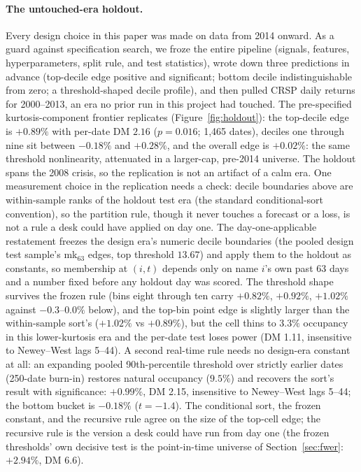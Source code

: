 \documentclass[11pt]{article}
\theoremstyle{remark}
\begin{document}
\paragraph{The untouched-era holdout.} Every design choice in this paper
was made on data from 2014 onward. As a guard against specification
search, we froze the entire pipeline (signals, features,
hyperparameters, split rule, and test statistics), wrote down three
predictions in advance (top-decile edge positive and significant; bottom decile
indistinguishable from zero; a threshold-shaped decile profile), and
then pulled CRSP daily returns for 2000--2013, an era no prior run in
this project had touched. The pre-specified kurtosis-component frontier
replicates (Figure~\ref{fig:holdout}): the top-decile edge is $+0.89\%$ with
per-date DM $2.16$ ($p=0.016$; 1{,}465 dates), deciles one through nine
sit between $-0.18\%$ and $+0.28\%$, and the overall edge is
$+0.02\%$: the same threshold nonlinearity, attenuated in a
larger-cap, pre-2014 universe. The holdout spans the 2008 crisis, so
the replication is not an artifact of a calm era.
One measurement choice in the replication needs a check:
decile boundaries above are within-sample ranks of the holdout test
era (the standard conditional-sort convention), so the partition rule, though it never touches a forecast or a loss,
is not a rule a desk could have applied on day one.
The day-one-applicable restatement freezes the design era's
numeric decile boundaries (the pooled design test sample's mk$_{63}$
edges, top threshold $13.67$) and apply them to the holdout as
constants, so membership at $(i,t)$ depends only on name $i$'s own
past 63 days and a number fixed before any holdout day was scored.
The threshold shape survives the frozen rule (bins eight through
ten carry $+0.82\%$, $+0.92\%$, $+1.02\%$ against $-0.3$--$0.0\%$
below), and the top-bin point edge is slightly larger than
the within-sample sort's ($+1.02\%$ vs $+0.89\%$), but the cell
thins to $3.3\%$ occupancy in this lower-kurtosis era and the
per-date test loses power (DM 1.11, insensitive to Newey--West lags
5--44). A second real-time rule needs no design-era constant at all: an
expanding pooled 90th-percentile threshold over strictly earlier
dates (250-date burn-in) restores natural occupancy ($9.5\%$) and
recovers the sort's result with significance: $+0.99\%$, DM 2.15,
insensitive to Newey--West lags 5--44; the bottom bucket is
$-0.18\%$ ($t=-1.4$). The conditional sort, the frozen constant, and
the recursive rule agree on the size of the top-cell edge; the
recursive rule is the version a desk could have run from day one
(the frozen thresholds' own decisive test is the point-in-time
universe of Section~\ref{sec:fwer}: $+2.94\%$, DM 6.6).
\end{document}
